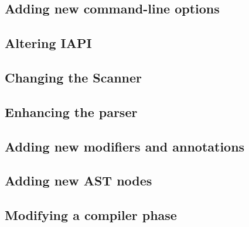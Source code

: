 \subsection{Adding new command-line options}
\subsection{Altering IAPI}
\subsection{Changing the Scanner}
\subsection{Enhancing the parser}
\subsection{Adding new modifiers and annotations}
\subsection{Adding new AST nodes}
\subsection{Modifying a compiler phase}


